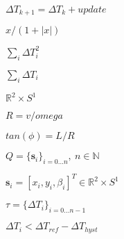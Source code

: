 \documentclass{article}
\begin{document}
$ \Delta T_{k+1} = \Delta T_k + update $
\pagebreak

$ x / (1 + |x|) $
\pagebreak

$ \sum_i \Delta T_i^2 $
\pagebreak

$ \sum_i \Delta T_i $
\pagebreak

$ \mathbb{R}^2 \times S^1 $
\pagebreak

$ R = v/omega $
\pagebreak

$ tan(\phi) = L/R $
\pagebreak

$ Q = \lbrace \mathbf{s}_i \rbrace_{i=0...n},\ n \in \mathbb{N} $
\pagebreak

$ \mathbf{s}_i = [x_i, y_i, \beta_i]^T \in \mathbb{R}^2 \times S^1 $
\pagebreak

$ \tau = \lbrace \Delta T_i \rbrace_{i=0...n-1} $
\pagebreak

$ \Delta T_i < \Delta T_{ref} - \Delta T_{hyst} $
\pagebreak
\end{document}
